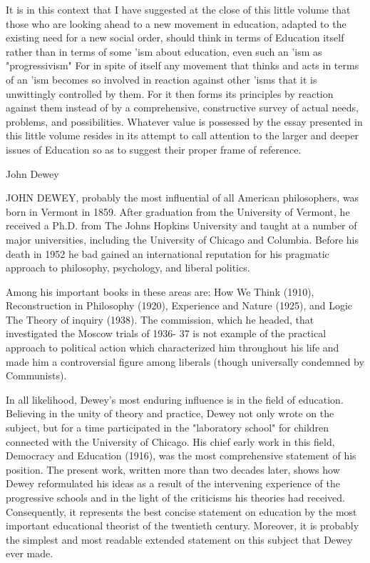 It is in this context that I have suggested at the close of this little volume that those 
who are looking ahead to a new movement in education, adapted to the existing need for 
a new social order, should think in terms of Education itself rather than in terms of some 
'ism about education, even such an 'ism as "progressivism" For in spite of itself any 
movement that thinks and acts in terms of an 'ism becomes so involved in reaction 
against other 'isms that it is unwittingly controlled by them. For it then forms its 
principles by reaction against them instead of by a comprehensive, constructive survey of 
actual needs, problems, and possibilities. Whatever value is possessed by the essay 
presented in this little volume resides in its attempt to call attention to the larger and 
deeper issues of Education so as to suggest their proper frame of reference. 


John Dewey 


JOHN DEWEY, probably the most influential of all American philosophers, was born 
in Vermont in 1859. After graduation from the University of Vermont, he received a 
Ph.D. from The Johns Hopkins University and taught at a number of major universities, 
including the University of Chicago and Columbia. Before his death in 1952 he bad 
gained an international reputation for his pragmatic approach to philosophy, psychology, 
and liberal politics. 

Among his important books in these areas are: How We Think (1910), Reconstruction 
in Philosophy (1920), Experience and Nature (1925), and Logic The Theory of inquiry 
(1938). The commission, which he headed, that investigated the Moscow trials of 1936- 
37 is not example of the practical approach to political action which characterized him 
throughout his life and made him a controversial figure among liberals (though 
universally condemned by Communists). 

In all likelihood, Dewey's most enduring influence is in the field of education. 
Believing in the unity of theory and practice, Dewey not only wrote on the subject, but 
for a time participated in the "laboratory school" for children connected with the 
University of Chicago. His chief early work in this field, Democracy and Education 
(1916), was the most comprehensive statement of his position. The present work, written 
more than two decades later, shows how Dewey reformulated his ideas as a result of the 
intervening experience of the progressive schools and in the light of the criticisms his 
theories had received. Consequently, it represents the best concise statement on education 
by the most important educational theorist of the twentieth century. Moreover, it is 
probably the simplest and most readable extended statement on this subject that Dewey 
ever made. 


